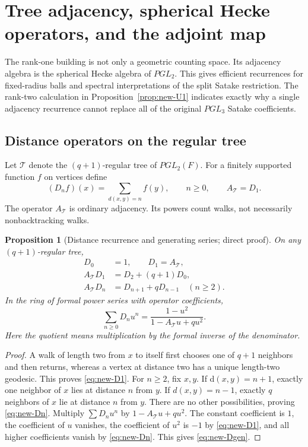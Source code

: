\documentclass[12pt,letterpaper]{amsart}
\numberwithin{equation}{section}
\newtheorem{proposition}[theorem]{Proposition}
\theoremstyle{definition}
\theoremstyle{plain}
\begin{document}
\section{Tree adjacency, spherical Hecke operators, and the adjoint map}
\label{sec:new-hecke}

The rank-one building is not only a geometric counting space.
Its adjacency algebra is the spherical Hecke algebra of $PGL_2$.
This gives efficient recurrences for fixed-radius balls and
spectral interpretations of the split Satake restriction. The
rank-two calculation in Proposition~\ref{prop:new-U1} indicates
exactly why a single adjacency recurrence cannot replace all
of the original $PGL_3$ Satake coefficients.

\subsection{Distance operators on the regular tree}
Let $\mathcal T$ denote the $(q+1)$-regular tree of $PGL_2(F)$.
For a finitely supported function $f$ on vertices define
\[
 (D_nf)(x)=\sum_{d(x,y)=n}f(y),\qquad n\geq0,
 \qquad A_{\mathcal T}=D_1.
\]
The operator $A_{\mathcal T}$ is ordinary adjacency. Its powers
count walks, not necessarily nonbacktracking walks.

\begin{proposition}[Distance recurrence and generating series;
direct proof]\label{prop:new-D}
On any $(q+1)$-regular tree,
\begin{align}
 D_0&=1,\qquad D_1=A_{\mathcal T},\nonumber\\
 A_{\mathcal T}D_1&=D_2+(q+1)D_0,\label{eq:new-D1}\\
 A_{\mathcal T}D_n&=D_{n+1}+qD_{n-1}\quad(n\geq2).
 \label{eq:new-Dn}
\end{align}
In the ring of formal power series with operator coefficients,
\begin{equation}\label{eq:new-Dgen}
 \sum_{n\geq0}D_nu^n
 =\frac{1-u^2}{1-A_{\mathcal T}u+qu^2}.
\end{equation}
Here the quotient means multiplication by the formal inverse
of the denominator.
\end{proposition}
\begin{proof}
A walk of length two from $x$ to itself first chooses one of
$q+1$ neighbors and then returns, whereas a vertex at distance
two has a unique length-two geodesic. This proves
\eqref{eq:new-D1}. For $n\geq2$, fix $x,y$. If
d$(x,y)=n+1$, exactly one neighbor of $x$ lies at distance $n$
from $y$. If $d(x,y)=n-1$, exactly $q$ neighbors of $x$ lie at
distance $n$ from $y$. There are no other possibilities,
proving \eqref{eq:new-Dn}. Multiply $\sum D_nu^n$ by
$1-A_{\mathcal T}u+qu^2$. The constant coefficient is $1$,
the coefficient of $u$ vanishes, the coefficient of $u^2$
is $-1$ by \eqref{eq:new-D1}, and all higher coefficients
vanish by \eqref{eq:new-Dn}. This gives \eqref{eq:new-Dgen}.
\end{proof}
\end{document}
